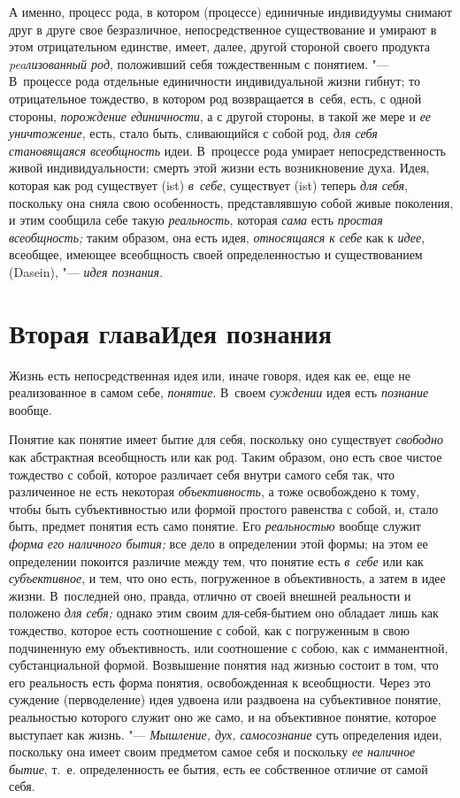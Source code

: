 А именно, процесс рода, в котором (процессе) единичные
индивидуумы снимают друг в друге свое безразличное, непосредственное
существование и умирают в этом отрицательном единстве, имеет, далее, другой
стороной своего продукта {\em peaлизованный род},
положивший себя тождественным с понятием. "--- В~процессе рода
отдельные единичности индивидуальной жизни гибнут; то
отрицательное тождество, в котором род возвращается в~себя, есть, с одной
стороны, {\em порождение единичности},
а с другой стороны, в такой же мере и {\em ее уничтожение},
есть, стало быть, сливающийся с собой род,
{\em для себя становящаяся всеобщность}
идеи. В~процессе рода умирает непосредственность живой
индивидуальности; смерть этой жизни есть возникновение духа. Идея, которая
как род существует (ist) {\em в~себе},
существует (ist) теперь {\em для себя}, поскольку
она сняла свою особенность, представлявшую собой живые поколения, и этим
сообщила себе такую {\em реальность}, которая {\em сама}
есть {\em простая всеобщность;} таким образом, она есть идея,
{\em относящаяся к себе} как к {\em идее},
всеобщее, имеющее всеобщность своей определенностью и
существованием (Dasein), "--- {\em идея познания}.

\chapter[Вторая глава Идея познания]{Вторая глава\newline Идея познания}
Жизнь есть непосредственная идея или, иначе говоря, идея как
ее, еще не реализованное в самом себе, {\em понятие}. В~своем
{\em суждении} идея есть {\em познание} вообще.

Понятие как понятие имеет бытие для себя, поскольку оно
существует {\em свободно}
как абстрактная всеобщность или как род. Таким образом, оно
есть свое чистое тождество с собой, которое различает себя внутри самого
себя так, что различенное не есть некоторая {\em объективность}, а
тоже освобождено к тому, чтобы быть субъективностью или формой простого
равенства с собой, и, стало быть, предмет понятия есть само понятие. Его
{\em реальностью} вообще служит {\em форма} {\em его наличного бытия;}
все дело в определении этой формы; на этом ее определении
покоится различие между тем, что понятие есть
{\em в~себе} или как {\em субъективное}, и
тем, что оно есть, погруженное в объективность, а затем в идее жизни.
В~последней оно, правда, отлично от своей внешней реальности и положено
{\em для себя;} однако
этим своим для-себя-бытием оно обладает лишь как тождество, которое есть
соотношение с собой, как с погруженным в свою подчиненную ему
объективность, или соотношение с собою, как с имманентной, субстанциальной
формой. Возвышение понятия над жизнью состоит в том, что его реальность
есть форма понятия, освобожденная к всеобщности. Через это суждение
(перводеление) идея удвоена или раздвоена на субъективное понятие,
реальностью которого служит оно же само, и на объективное понятие, которое
выступает как жизнь. "--- {\em Мышление,
дух, самосознание} суть определения идеи, поскольку она
имеет своим предметом самое себя и поскольку
{\em ее наличное бытие},
т.~е. определенность ее бытия, есть ее собственное отличие от
самой себя.

